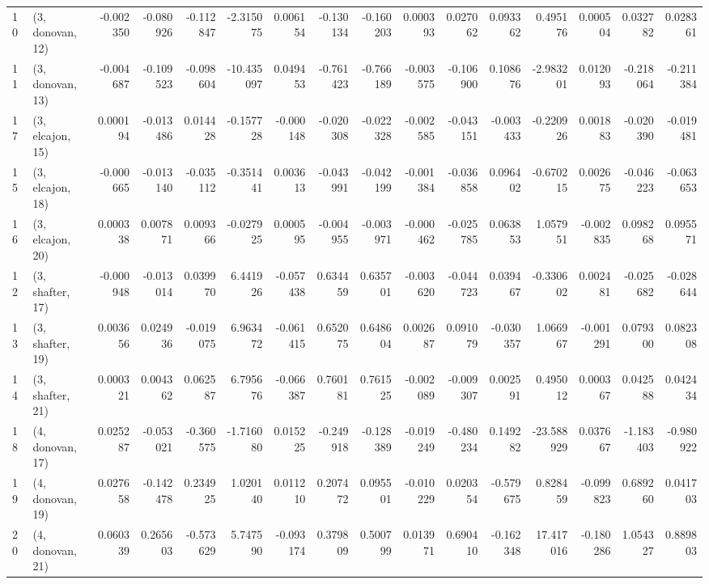 \begin{tabular}{llrrrrrrrrrrrrrr}
10 &  (3, donovan, 12) &  -0.002350 & -0.080926 & -0.112847 &  -2.315075 &  0.006154 &  -0.130134 & -0.160203 &  0.000393 &  0.027062 &  0.093362 &   0.495176 &  0.000504 &  0.032782 &  0.028361 \\
11 &  (3, donovan, 13) &  -0.004687 & -0.109523 & -0.098604 & -10.435097 &  0.049453 &  -0.761423 & -0.766189 & -0.003575 & -0.106900 &  0.108676 &  -2.983201 &  0.012093 & -0.218064 & -0.211384 \\
17 &  (3, elcajon, 15) &   0.000194 & -0.013486 &  0.014428 &  -0.157728 & -0.000148 &  -0.020308 & -0.022328 & -0.002585 & -0.043151 & -0.003433 &  -0.220926 &  0.001883 & -0.020390 & -0.019481 \\
15 &  (3, elcajon, 18) &  -0.000665 & -0.013140 & -0.035112 &  -0.351441 &  0.003613 &  -0.043991 & -0.042199 & -0.001384 & -0.036858 &  0.096402 &  -0.670215 &  0.002675 & -0.046223 & -0.063653 \\
16 &  (3, elcajon, 20) &   0.000338 &  0.007871 &  0.009366 &  -0.027925 &  0.000595 &  -0.004955 & -0.003971 & -0.000462 & -0.025785 &  0.063853 &   1.057951 & -0.002835 &  0.098268 &  0.095571 \\
12 &  (3, shafter, 17) &  -0.000948 & -0.013014 &  0.039970 &   6.441926 & -0.057438 &   0.634459 &  0.635701 & -0.003620 & -0.044723 &  0.039467 &  -0.330602 &  0.002481 & -0.025682 & -0.028644 \\
13 &  (3, shafter, 19) &   0.003656 &  0.024936 & -0.019075 &   6.963472 & -0.061415 &   0.652075 &  0.648604 &  0.002687 &  0.091079 & -0.030357 &   1.066967 & -0.001291 &  0.079300 &  0.082308 \\
14 &  (3, shafter, 21) &   0.000321 &  0.004362 &  0.062587 &   6.795676 & -0.066387 &   0.760181 &  0.761525 & -0.002089 & -0.009307 &  0.002591 &   0.495012 &  0.000367 &  0.042588 &  0.042434 \\
18 &  (4, donovan, 17) &   0.025287 & -0.053021 & -0.360575 &  -1.716080 &  0.015225 &  -0.249918 & -0.128389 & -0.019249 & -0.480234 &  0.149282 & -23.588929 &  0.037667 & -1.183403 & -0.980922 \\
19 &  (4, donovan, 19) &   0.027658 & -0.142478 &  0.234925 &   1.020140 &  0.011210 &   0.207472 &  0.095501 & -0.010229 &  0.020354 & -0.579675 &   0.828459 & -0.099823 &  0.689260 &  0.041703 \\
20 &  (4, donovan, 21) &   0.060339 &  0.265603 & -0.573629 &   5.747590 & -0.093174 &   0.379809 &  0.500799 &  0.013971 &  0.690410 & -0.162348 &  17.417016 & -0.180286 &  1.054327 &  0.889803 \\

\end{tabular}
